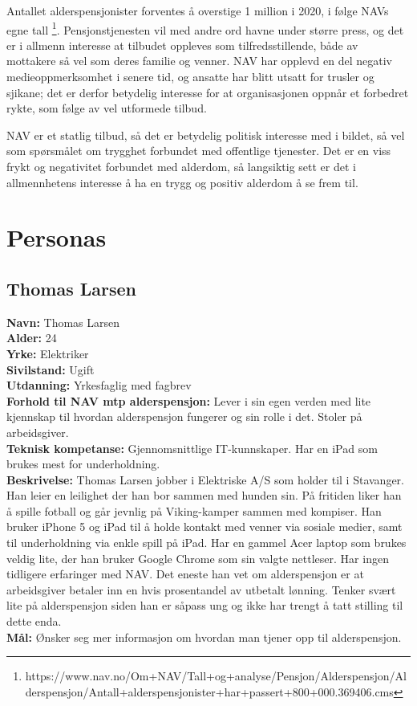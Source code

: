 \documentclass[informationsecurity]{gucmasterproject}
\begin{document}
Antallet alderspensjonister forventes å overstige 1 million i 2020, i følge NAVs egne tall \footnote{https://www.nav.no/Om+NAV/Tall+og+analyse/Pensjon/Alderspensjon/Alderspensjon/Antall+alderspensjonister+har+passert+800+000.369406.cms}. Pensjonstjenesten vil med andre ord havne under større press, og det er i allmenn interesse at tilbudet oppleves som tilfredsstillende, både av mottakere så vel som deres familie og venner. NAV har opplevd en del negativ medieoppmerksomhet i senere tid, og ansatte har blitt utsatt for trusler og sjikane; det er derfor betydelig interesse for at organisasjonen oppnår et forbedret rykte, som følge av vel utformede tilbud.

NAV er et statlig tilbud, så det er betydelig politisk interesse med i bildet, så vel som spørsmålet om trygghet forbundet med offentlige tjenester. Det er en viss frykt og negativitet forbundet med alderdom, så langsiktig sett er det i allmennhetens interesse å ha en trygg og positiv alderdom å se frem til.



\section{Personas}
\subsection{Thomas Larsen}
\textbf{Navn:} Thomas Larsen \\
\textbf{Alder:} 24 \\
\textbf{Yrke:} Elektriker \\
\textbf{Sivilstand:} Ugift \\
\textbf{Utdanning:} Yrkesfaglig med fagbrev \\
\textbf{Forhold til NAV mtp alderspensjon:} Lever i sin egen verden med lite kjennskap til hvordan alderspensjon fungerer og sin rolle i det. Stoler på arbeidsgiver. \\
\textbf{Teknisk kompetanse:} Gjennomsnittlige IT-kunnskaper. Har en iPad som brukes mest for underholdning.  \\
\textbf{Beskrivelse:} Thomas Larsen jobber i Elektriske A/S som holder til i Stavanger. Han leier en leilighet der han bor sammen med hunden sin. På fritiden liker han å spille fotball og går jevnlig på Viking-kamper sammen med kompiser. Han bruker iPhone 5 og iPad til å holde kontakt med venner via sosiale medier, samt til underholdning via enkle spill på iPad. Har en gammel Acer laptop som brukes veldig lite, der han bruker Google Chrome som sin valgte nettleser. Har ingen tidligere erfaringer med NAV. Det eneste han vet om alderspensjon er at arbeidsgiver betaler inn en hvis prosentandel av utbetalt lønning. Tenker svært lite på alderspensjon siden han er såpass ung og ikke har trengt å tatt stilling til dette enda. \\
\textbf{Mål:} Ønsker seg mer informasjon om hvordan man tjener opp til alderspensjon.  \\
\end{document}

